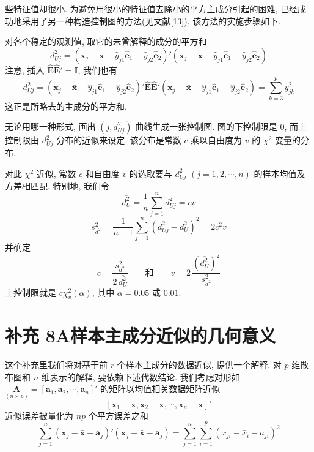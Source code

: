 
些特征值却很小. 为避免用很小的特征值去除小的平方主成分引起的困难, 已经成功地采用了另一种构造控制图的方法(见文献[13]). 该方法的实施步骤如下.

对各个稳定的观测值, 取它的未曾解释的成分的平方和
\[
d_{Uj}^2=(\mathbf{x}_j-\bar{\mathbf{x}}-\hat{y}_{j1}\hat{\mathbf{e}}_1-\hat{y}_{j2}\hat{\mathbf{e}}_2)'(\mathbf{x}_j-\bar{\mathbf{x}}-\hat{y}_{j1}\hat{\mathbf{e}}_1-\hat{y}_{j2}\hat{\mathbf{e}}_2)
\]
注意, 插入 $\hat{\mathbf{E}}\hat{\mathbf{E}}'=\mathbf{I}$, 我们也有
\[
d_{Uj}^2=(\mathbf{x}_j-\bar{\mathbf{x}}-\hat{y}_{j1}\hat{\mathbf{e}}_1-\hat{y}_{j2}\hat{\mathbf{e}}_2)'\hat{\mathbf{E}}\hat{\mathbf{E}}'(\mathbf{x}_j-\bar{\mathbf{x}}-\hat{y}_{j1}\hat{\mathbf{e}}_1-\hat{y}_{j2}\hat{\mathbf{e}}_2)=\sum_{k=3}^{p}\hat{y}_{jk}^2
\]
这正是所略去的主成分的平方和.

无论用哪一种形式, 画出 $(j,d_{Uj}^2)$ 曲线生成一张控制图. 图的下控制限是 0, 而上控制限由 $d_{Uj}^2$ 分布的近似来设定, 该分布是常数 $c$ 乘以自由度为 $v$ 的 $\chi^2$ 变量的分布.

对此 $\chi^2$ 近似, 常数 $c$ 和自由度 $v$ 的选取要与 $d_{Uj}^2$ $(j=1,2,\cdots,n)$ 的样本均值及方差相匹配. 特别地, 我们令
\[
\overline{d_U^2}=\frac{1}{n}\sum_{j=1}^{n}d_{Uj}^2=cv
\]
\[
s_{d^2}^2=\frac{1}{n-1}\sum_{j=1}^{n}(d_{Uj}^2-\overline{d_U^2})^2=2c^2v
\]
并确定
\[
c=\frac{s_{d^2}^2}{2\,\overline{d_U^2}}\qquad\text{和}\qquad v=2\,\frac{(\overline{d_U^2})^2}{s_{d^2}^2}
\]
上控制限就是 $c\chi_v^2(\alpha)$, 其中 $\alpha=0.05$ 或 $0.01$.

\section*{补充 8A\quad 样本主成分近似的几何意义}
\label{sec:8.7}

这个补充里我们将对基于前 $r$ 个样本主成分的数据近似, 提供一个解释. 对 $p$ 维散布图和 $n$ 维表示的解释, 要依赖下述代数结论. 我们考虑对形如 $\underset{(n\times p)}{\mathbf{A}}=[\mathbf{a}_1,\mathbf{a}_2,\cdots,\mathbf{a}_n]'$ 的矩阵以均值相关数据矩阵近似
\[
[\mathbf{x}_1-\bar{\mathbf{x}},\mathbf{x}_2-\bar{\mathbf{x}},\cdots,\mathbf{x}_n-\bar{\mathbf{x}}]'
\]
近似误差被量化为 $np$ 个平方误差之和
\label{eq:8A-1}
\begin{equation}
\sum_{j=1}^{n}(\mathbf{x}_j-\bar{\mathbf{x}}-\mathbf{a}_j)'(\mathbf{x}_j-\bar{\mathbf{x}}-\mathbf{a}_j)=\sum_{j=1}^{n}\sum_{i=1}^{p}(x_{ji}-\bar{x}_i-a_{ji})^2 \tag{8A-1}
\end{equation}

